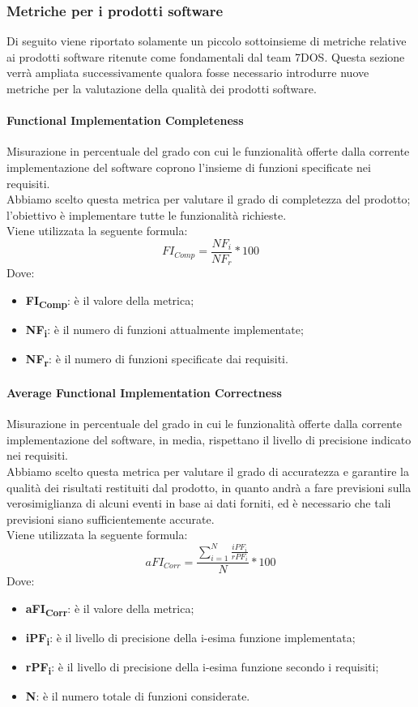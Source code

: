 \subsubsection{Metriche per i prodotti software}\Spazio
Di seguito viene riportato solamente un piccolo sottoinsieme di metriche relative ai prodotti software ritenute come fondamentali dal team 7DOS.
Questa sezione verrà ampliata successivamente qualora fosse necessario introdurre nuove metriche per la valutazione della qualità dei prodotti software.

\paragraph{Functional Implementation Completeness}\Spazio
Misurazione in percentuale del grado con cui le funzionalità offerte dalla corrente implementazione del software coprono l'insieme di funzioni specificate nei requisiti.\\
Abbiamo scelto questa metrica per valutare il grado di completezza del prodotto; l'obiettivo è implementare tutte le funzionalità richieste.\\
Viene utilizzata la seguente formula:
$$FI_{Comp}=\frac{NF_i}{NF_r}*100$$
Dove:
\begin{itemize}
	\item{\textbf{FI\textsubscript{Comp}}: è il valore della metrica;}
	\item{\textbf{NF\textsubscript{i}}: è il numero di funzioni attualmente implementate;}
	\item{\textbf{NF\textsubscript{r}}: è il numero di funzioni specificate dai requisiti.}
\end{itemize}
\paragraph{Average Functional Implementation Correctness}\Spazio
Misurazione in percentuale del grado in cui le funzionalità offerte dalla corrente implementazione del software, in media, rispettano il livello di precisione indicato nei requisiti.\\
Abbiamo scelto questa metrica per valutare il grado di accuratezza e garantire la qualità dei risultati restituiti dal prodotto, in quanto andrà a fare previsioni sulla verosimiglianza di alcuni eventi in base ai dati forniti, ed è necessario che tali previsioni siano sufficientemente accurate.\\
Viene utilizzata la seguente formula:
$$aFI_{Corr}=\frac{\sum\limits_{i=1}^N\frac{iPF_i}{rPF_i}}{N}*100$$
Dove:
\begin{itemize}
	\item{\textbf{aFI\textsubscript{Corr}}: è il valore della metrica;}
	\item{\textbf{iPF\textsubscript{i}}: è il livello di precisione della i-esima funzione implementata;}
	\item{\textbf{rPF\textsubscript{i}}: è il livello di precisione della i-esima funzione secondo i requisiti;}
	\item{\textbf{N}: è il numero totale di funzioni considerate.}
\end{itemize}

